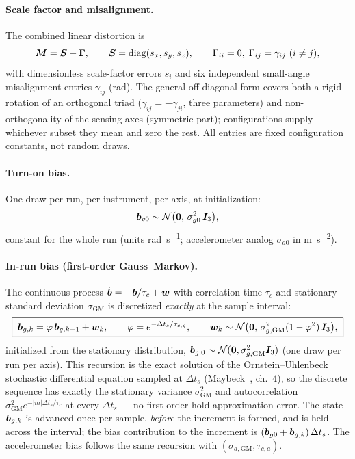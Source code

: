 \paragraph{Scale factor and misalignment.} The combined linear distortion
is
\begin{equation}
  \bm{M} = \bm{S} + \bm{\Gamma},
  \qquad
  \bm{S} = \mathrm{diag}(s_x, s_y, s_z),
  \qquad
  \Gamma_{ii} = 0,\; \Gamma_{ij} = \gamma_{ij}\ (i \ne j),
  \label{eq:imu:mis}
\end{equation}
with dimensionless scale-factor errors $s_i$ and six independent
small-angle misalignment entries $\gamma_{ij}$ (\unit{\radian}). The
general off-diagonal form covers both a rigid rotation of an orthogonal
triad ($\gamma_{ij} = -\gamma_{ji}$, three parameters) and
non-orthogonality of the sensing axes (symmetric part); configurations
supply whichever subset they mean and zero the rest. All entries are
fixed configuration constants, not random draws.

\paragraph{Turn-on bias.} One draw per run, per instrument, per axis, at
initialization:
\begin{equation}
  \bm{b}_{g0} \sim \mathcal{N}\bigl(\bm{0},\,
    \sigma_{g0}^2\,\bm{I}_3\bigr),
  \label{eq:imu:turnon}
\end{equation}
constant for the whole run (units \unit{\radian\per\second}; accelerometer
analog $\sigma_{a0}$ in \unit{\metre\per\second\squared}).

\paragraph{In-run bias (first-order Gauss--Markov).} The continuous
process $\dot{\bm{b}} = -\bm{b}/\tau_c + \bm{w}$ with correlation time
$\tau_c$ and stationary standard deviation $\sigma_{\mathrm{GM}}$ is
discretized \emph{exactly} at the sample interval:
\begin{equation}
  \boxed{\;
  \bm{b}_{g,k} = \varphi\, \bm{b}_{g,k-1} + \bm{w}_k,
  \qquad
  \varphi = e^{-\Delta t_s/\tau_{c,g}},
  \qquad
  \bm{w}_k \sim \mathcal{N}\bigl(\bm{0},\,
    \sigma_{g,\mathrm{GM}}^2 (1 - \varphi^2)\, \bm{I}_3\bigr),
  \;}
  \label{eq:imu:gm}
\end{equation}
initialized from the stationary distribution,
$\bm{b}_{g,0} \sim \mathcal{N}(\bm{0},
\sigma_{g,\mathrm{GM}}^2 \bm{I}_3)$ (one draw per run per axis). This
recursion is the exact solution of the Ornstein--Uhlenbeck stochastic
differential equation sampled at $\Delta t_s$ (Maybeck~\cite{maybeck1979},
ch.~4), so the discrete sequence has exactly the stationary variance
$\sigma_{\mathrm{GM}}^2$ and autocorrelation
$\sigma_{\mathrm{GM}}^2 e^{-|m|\Delta t_s/\tau_c}$ at every
$\Delta t_s$ --- no first-order-hold approximation error. The state
$\bm{b}_{g,k}$ is advanced once per sample, \emph{before} the increment
is formed, and is held across the interval; the bias contribution to the
increment is $(\bm{b}_{g0} + \bm{b}_{g,k})\,\Delta t_s$. The
accelerometer bias follows the same recursion with
$(\sigma_{a,\mathrm{GM}}, \tau_{c,a})$.

